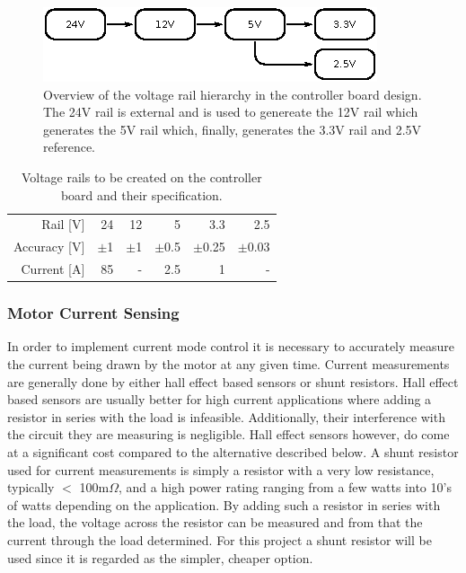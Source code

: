 \begin{figure}[h]
	\centering
	\includegraphics[width=.75\linewidth]{graphics/rail_hierarchy}
	\caption[Overview of the voltage rail hierarchy in the controller board design.]{Overview of the voltage rail hierarchy in the controller board design. The 24V rail is external and is used to genereate the 12V rail which generates the 5V rail which, finally, generates the 3.3V rail and 2.5V reference.}
	\label{fig:figure1}
\end{figure}

\begin{table}[h]
	\centering
	\begin{tabular}{r | r | r | r | r | r}
		Rail [V] & 24 & 12 & 5 & 3.3 & 2.5\\
		Accuracy [V] & $\pm$1 & $\pm$1 & $\pm$0.5 & $\pm$0.25 & $\pm$0.03\\
		Current [A] & 85 & - & 2.5 & 1 & -
	\end{tabular}
	\caption{Voltage rails to be created on the controller board and their specification.}
	\label{tab:powerrails}
\end{table}

\subsubsection{Motor Current Sensing}
In order to implement current mode control it is necessary to accurately measure the current being drawn by the motor at any given time.
Current measurements are generally done by either hall effect based sensors or shunt resistors. 
Hall effect based sensors are usually better for high current applications where adding a resistor in series with the load is infeasible. 
Additionally, their interference with the circuit they are measuring is negligible.
Hall effect sensors however, do come at a significant cost compared to the alternative described below.
A shunt resistor used for current measurements is simply a resistor with a very low resistance, typically $<$ 100m$\Omega$, and a high power rating ranging from a few watts into 10's of watts depending on the application.
By adding such a resistor in series with the load, the voltage across the resistor can be measured and from that the current through the load determined.
For this project a shunt resistor will be used since it is regarded as the simpler, cheaper option.

